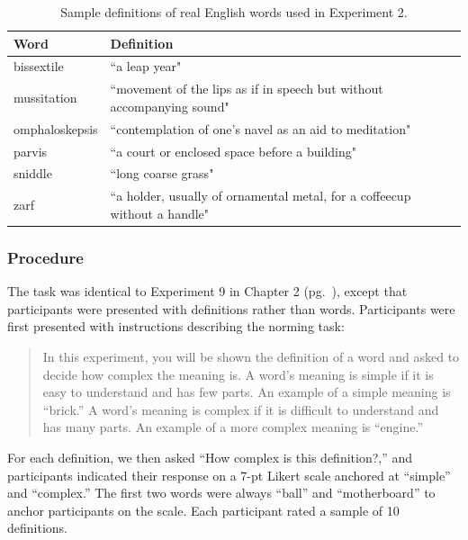 \begin{table}[t!]
\centering

\begin{tabular}{ll}
\toprule
\textbf{Word} & \textbf{Definition}                \\
\toprule
   bissextile & ``a leap year"\\
   mussitation  &  \multicolumn{1}{p{12cm}}{ ``movement of the lips as if in speech but without accompanying sound"}    \\
   omphaloskepsis  &  \multicolumn{1}{p{12cm}}{ ``contemplation of one's navel as an aid to meditation"}                  \\
   parvis    &  \multicolumn{1}{p{12cm}}{ ``a court or enclosed space before a building"}                               \\
   sniddle      &  \multicolumn{1}{p{12cm}}{ ``long coarse grass"}     \\
   zarf     & \multicolumn{1}{p{12cm}}{ ``a holder, usually of ornamental metal, for a coffeecup without a handle"}                                 \\

 \bottomrule
\end{tabular}
\caption{Sample definitions of real English words used in Experiment 2.}
\label{tab:sample_word_defs}
\end{table}


\subsubsection{Procedure}
The task was identical to Experiment 9 in Chapter 2 (pg.\ \pageref{ch2-9}), except that participants were presented with definitions rather than words. Participants were first presented with instructions describing the norming task:
\begin{quote}
In this experiment, you will be shown the definition of a word and asked to decide how complex the meaning is. A word's meaning is simple if it is easy to understand and has few parts. An example of a simple meaning is ``brick.'' A word's meaning is complex if it is difficult to understand and has many parts. An example of a more complex meaning is ``engine.''
\end{quote}
For each definition, we then asked ``How complex is this definition?,'' and participants indicated their response on a 7-pt Likert scale anchored at ``simple'' and ``complex.'' The first two words were always ``ball'' and ``motherboard'' to anchor participants on the scale. Each participant rated a sample of 10 definitions. 

